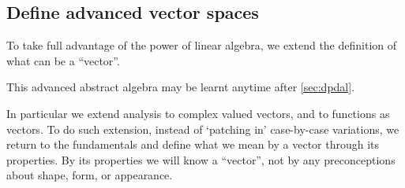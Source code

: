 \begin{draft}
\section{Define advanced vector spaces}
\label{sec:davsof}

\secttoc

\begin{comment}
axiomatic approach.  Rebuild the foundations.
Maybe \pooliv{Ch.6 and~7} \larsvii{Ch.5 and~8} \holti{Ch.10, \S11.4--5}
\end{comment}

To take full advantage of the power of linear algebra, we extend the definition of what can be a ``vector''.
\begin{aside}
This advanced abstract algebra may be learnt anytime after \cref{sec:dpdal}.
\end{aside}
In particular we extend analysis to complex valued vectors, and to functions as vectors.
To do such extension, instead of `patching in' case-by-case variations, we return to the fundamentals and define what we mean by a vector through its properties.
By its properties we will know a ``vector'', not by any preconceptions about shape, form, or appearance.



\end{draft}
